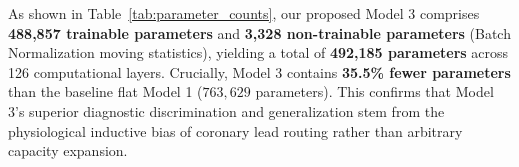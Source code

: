\documentclass[12pt]{elsarticle}
\begin{document}
\begin{table}[htbp]
\caption{Comprehensive Parameter Counts and Layer Complexity across Evaluated Architectures.}
\label{tab:parameter_counts}
\centering
\small
\setlength{\tabcolsep}{3.5pt}
\end{table}

As shown in Table~\ref{tab:parameter_counts}, our proposed Model 3 comprises \textbf{488,857 trainable parameters} and \textbf{3,328 non-trainable parameters} (Batch Normalization moving statistics), yielding a total of \textbf{492,185 parameters} across 126 computational layers. Crucially, Model 3 contains \textbf{35.5\% fewer parameters} than the baseline flat Model 1 ($763,629$ parameters). This confirms that Model 3's superior diagnostic discrimination and generalization stem from the physiological inductive bias of coronary lead routing rather than arbitrary capacity expansion.
\end{document}
